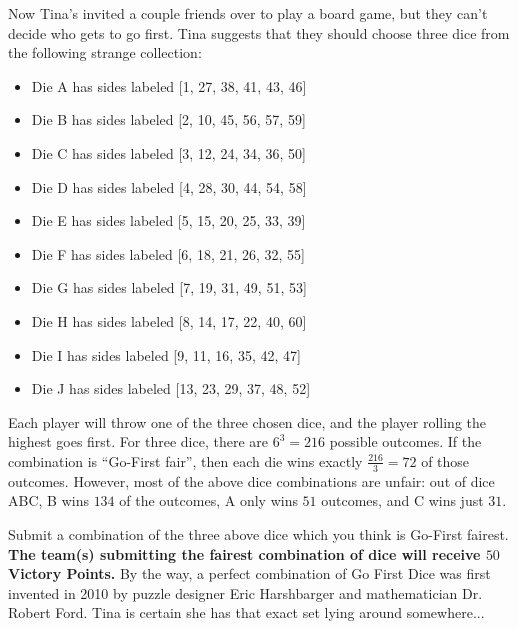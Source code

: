 \begin{puzzle}
\vfill

\begin{center}
\end{center}
\begin{center}
\end{center}

\vfill




\end{puzzle}

\begin{extraPuzzle}
Now Tina's invited a couple friends over to play a board game, but they
can't decide who gets to go first. Tina suggests that they should choose
three dice from the following strange collection:

\begin{itemize}
\item Die A has sides labeled [1, 27, 38, 41, 43, 46]
\item Die B has sides labeled [2, 10, 45, 56, 57, 59]
\item Die C has sides labeled [3, 12, 24, 34, 36, 50]
\item Die D has sides labeled [4, 28, 30, 44, 54, 58]
\item Die E has sides labeled [5, 15, 20, 25, 33, 39]
\item Die F has sides labeled [6, 18, 21, 26, 32, 55]
\item Die G has sides labeled [7, 19, 31, 49, 51, 53]
\item Die H has sides labeled [8, 14, 17, 22, 40, 60]
\item Die I has sides labeled [9, 11, 16, 35, 42, 47]
\item Die J has sides labeled [13, 23, 29, 37, 48, 52]
\end{itemize}

Each player will throw one of the three chosen dice, and the player rolling
the highest goes first. For three dice, there are \(6^3=216\) possible
outcomes. If the combination is ``Go-First fair'', then each die wins
exactly \(\frac{216}{3}=72\) of those outcomes. However, most of the
above dice combinations are unfair: out of dice ABC, B wins \(134\) of the
outcomes, A only wins \(51\) outcomes, and C wins just \(31\).

Submit a combination of the three above dice which you think is Go-First fairest.
\textbf{The team(s) submitting the fairest combination of dice
will receive \(50\) Victory Points.} By the way, a perfect combination of
Go First Dice was first
invented in 2010 by puzzle designer Eric Harshbarger and mathematician
Dr. Robert Ford. Tina is certain she has that exact set lying around somewhere...

\begin{center}
\end{center}

\end{extraPuzzle}



